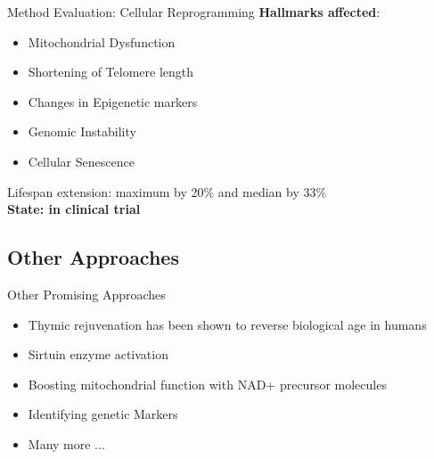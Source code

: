 \begin{frame}[c]{Method Evaluation: Cellular Reprogramming}
    \large
    \textbf{Hallmarks affected}: \\
    \begin{itemize}[<+(1)->]
        \item Mitochondrial Dysfunction
        \item Shortening of Telomere length
        \item Changes in Epigenetic markers
        \item Genomic Instability
        \item Cellular Senescence
    \end{itemize}
    \pause
    Lifespan extension: maximum by 20\% and median by 33\% \cite{ocampo2016vivo} \\
    \pause
    \textbf{State: in clinical trial}
\end{frame}



\subsection{Other Approaches}

\begin{frame}[c]{Other Promising Approaches}
    \large
    \begin{itemize}[<+(1)->]
        \item Thymic rejuvenation has been shown to reverse biological age in humans \cite{fahy2019reversal}
        \item Sirtuin enzyme activation \cite{mohar2012sirtuin}
        \item Boosting mitochondrial function with NAD+ precursor molecules \cite{aman2018therapeutic}
        \item Identifying genetic Markers \cite{kenyon2010genetics}
        \item Many more ...
    \end{itemize}
\end{frame}


